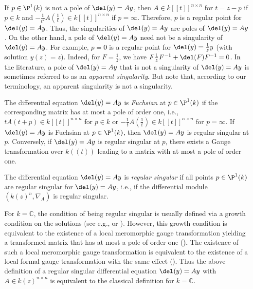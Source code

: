 \documentclass[a4paper, 11pt]{article}
\begin{document}
 If $p\in\P^1(k)$ is not a pole of $\del(y)=Ay$, then $A\in k[[t]]^{n\times n}$ for $t=z-p$ if $p\in k$ and $-\frac{1}{t^2}A(\frac{1}{t})\in k[[t]]^{n\times n}$ if $p=\infty$. Therefore, $p$ is a regular point for $\del(y)=Ay$. Thus, the singularities of $\del(y)=Ay$ are poles of $\del(y)=Ay$. On the other hand, a pole of $\del(y)=Ay$ need not be a singularity of $\del(y)=Ay$. For example, $p=0$ is a regular point for $\del(y)=\frac{1}{z}y$ (with solution $y(z)=z$). Indeed, for $F=\frac{1}{z}$, we have $F\frac{1}{z}F^{-1}+\del(F)F^{-1}=0$. In the literature, a pole of $\del(y)=Ay$ that is not a singularity of $\del(y)=Ay$ is sometimes referred to as an \emph{apparent singularity}. But note that, according to our terminology, an apparent singularity is not a singularity.
 
 
 The differential equation $\del(y)=Ay$ is \emph{Fuchsian} at $p\in\P^1(k)$ if the corresponding matrix has at most a pole of order one, i.e., $tA(t+p)\in k[[t]]^{n\times n}$ for $p\in k$ or $-\frac{1}{t}A(\frac{1}{t})\in k[[t]]^{n\times n}$ for $p=\infty$. If $\del(y)=Ay$ is Fuchsian at $p\in\P^1(k)$, then $\del(y)=Ay$ is regular singular at $p$. Conversely, if $\del(y)=Ay$ is regular singular at $p$, there exists a Gauge transformation over $k((t))$ leading to a matrix with at most a pole of order one. 
 
 




The differential equation $\del(y)=Ay$ is \emph{regular singular} if all points $p\in \P^1(k)$ are regular singular for $\del(y)=Ay$, i.e., if the differential module $(k(z)^n,\nabla_A)$ is regular singular. 

For $k=\mathbb{C}$, the condition of being regular singular is usually defined via a growth condition on the solutions (see e.g., \cite[Def. 9.11]{Saul} or \cite[Part I, Def. 1.24]{MitschiSauzin}). However, this growth condition is equivalent to the existence of a local meromorphic gauge transformation yielding a transformed matrix that has at most a pole of order one (\cite[Theorem 9.17]{Saul}). The existence of such a local meromorphic gauge transformation is equivalent to the existence of a local formal gauge transformation with the same effect (\cite[Prop. 3.12 and Lemma 3.42]{SVDP}). Thus the above definition of a regular singular differential equation $\del(y)=Ay$ with $A\in k(z)^{n\times n}$ is equivalent to the classical definition for $k=\mathbb{C}$. 
\end{document}
